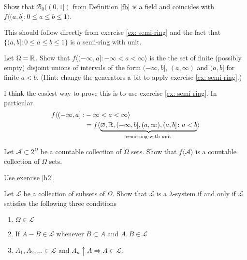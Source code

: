\begin{exercise} \label{stofB}
Show that  $\mathcal B_0((0,1])$ from Definition \ref{fb} is a field and coincides with $f\langle (a,b]: 0\leq a\leq b\leq 1 \rangle $.
\end{exercise}

\begin{exerciseproof}
This should follow directly from exercise \ref{ex: semi-ring} and the fact that $\{ (a,b]: 0\leq a\leq b\leq 1 \}$ is a semi-ring with unit.
\end{exerciseproof}


\begin{exercise}
\label{ex1}
Let $\Omega = \Bbb R$.
Show that $f\langle (-\infty,a]: -\infty< a< \infty\rangle$  is the the set of finite (possibly empty) disjoint unions of intervals of the form $(-\infty, b]$, $(a,\infty)$ and $(a,b]$ for finite $a < b$. (Hint:  change the generators a bit to apply exercise \ref{ex: semi-ring}.)
\end{exercise}

\begin{exerciseproof}
  I think the easiest way to prove this is to use exercise \ref{ex: semi-ring}. In particular
\begin{align*}
f\langle (-\infty,a]:& -\infty< a< \infty\rangle \\
&= f\langle \underbrace{\varnothing, \Bbb R, (-\infty, b], (a,\infty), (a,b]\colon a < b}_{\text{semi-ring-with unit}} \rangle
\end{align*}

\end{exerciseproof}


\begin{exercise} \label{countablly generated}
Let $\mathcal A\subset2^\Omega$ be a countable collection of $\Omega$ sets.
Show that  $f\langle\mathcal A\rangle$ is a  countable collection of $\Omega$ sets.
\end{exercise}

\begin{exerciseproof}
Use  exercise \ref{h2}.
\end{exerciseproof}



\begin{exercise}
Let $\mathcal L$ be a collection of subsets of $\Omega$. Show that $\mathcal L$ is a $\lambda$-system if and only if $\mathcal L$ satisfies the following three conditions
\begin{enumerate}
\item $\Omega \in \mathcal L$
\item If $A-B\in \mathcal L$ whenever $B\subset A$ and $A, B\in \mathcal L$
\item $A_1, A_2,\ldots\in\mathcal L$ and $A_n\uparrow A \Longrightarrow A\in\mathcal L$.
\end{enumerate}
\end{exercise}

